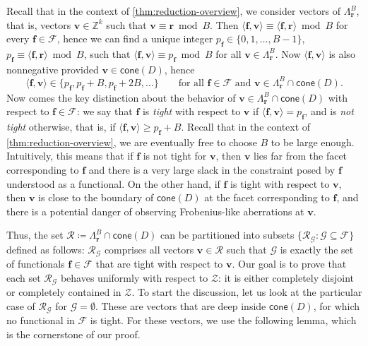 \documentclass{theoretics}
\renewcommand{\geq}{\geqslant}
\newcommand{\Z}{\mathbb{Z}}
\newcommand{\tup}[1]{{\mathbf{#1}}}
\newcommand{\ff}{\tup f}
\newcommand{\rr}{\tup r}
\newcommand{\myvv}{\tup v} %
\newcommand{\Ff}{\mathcal{F}}
\newcommand{\Gg}{\mathcal{G}}
\newcommand{\Rr}{\mathcal{R}}
\newcommand{\Zz}{\mathcal{Z}}
\newcommand{\sca}[2]{\langle #1,#2\rangle}
\newcommand{\realcone}{\mathsf{cone}}
\begin{document}
Recall that in the context of \cref{thm:reduction-overview}, we consider vectors of $\Lambda_\rr^B$, that is, vectors $\myvv\in \Z^k$ such that $\myvv\equiv \rr\bmod B$. Then $\sca{\ff}{\myvv}\equiv \sca{\ff}{\rr}\bmod B$ for every $\ff\in \Ff$, hence we can find a unique integer $p_\ff\in \{0,1,\ldots,B-1\}$, $p_\ff\equiv \sca{\ff}{\rr}\bmod B$, such that $\sca{\ff}{\myvv}\equiv p_\ff\bmod B$ for all $\myvv\in \Lambda_\rr^B$. Now $\sca{\ff}{\myvv}$ is also nonnegative provided $\myvv\in \realcone(D)$, hence
$$ \sca{\ff}{\myvv}\in \{p_\ff,p_\ff+B,p_\ff+2B,\ldots\}\qquad\textrm{for all }\ff\in \Ff\textrm{ and } \myvv\in\Lambda_\rr^B\cap \realcone(D).$$
Now comes the key distinction about the behavior of $\myvv\in \Lambda_{\rr}^B\cap \realcone(D)$ with respect to $\ff\in \Ff$: we say that $\ff$ is {\em{tight}} with respect to $\myvv$ if $\sca{\ff}{\myvv}=p_\ff$, and is {\em{not tight}} otherwise, that is, if $\sca{\ff}{\myvv}\geq p_\ff+B$. Recall that in the context of \cref{thm:reduction-overview}, we are eventually free to choose $B$ to be large enough. Intuitively, this means that if $\ff$ is not tight for $\myvv$, then $\myvv$ lies far from the facet corresponding to $\ff$ and there is a very large slack in the constraint posed by $\ff$ understood as a functional. On the other hand, if $\ff$ is tight with respect to $\myvv$, then $\myvv$ is close to the boundary of $\realcone(D)$ at the facet corresponding to $\ff$, and there is a potential danger of observing Frobenius-like aberrations at $\myvv$.

Thus, the set $\Rr\coloneqq \Lambda_\rr^B\cap \realcone(D)$ can be partitioned into subsets $\{\Rr_\Gg\colon \Gg\subseteq \Ff\}$ defined as follows: $\Rr_{\Gg}$ comprises all vectors $\myvv\in \Rr$ such that $\Gg$ is exactly the set of functionals $\ff\in \Ff$ that are tight with respect to $\myvv$. Our goal is to prove that each set $\Rr_\Gg$ behaves uniformly with respect to $\Zz$: it is either completely disjoint or completely contained in $\Zz$. To start the discussion, let us look at the particular case of $\Rr_\Gg$ for $\Gg=\emptyset$. These are vectors that are deep inside $\realcone(D)$, for which no functional in $\Ff$ is tight. For these vectors, we use the following lemma, which is the cornerstone of our proof.
\end{document}
